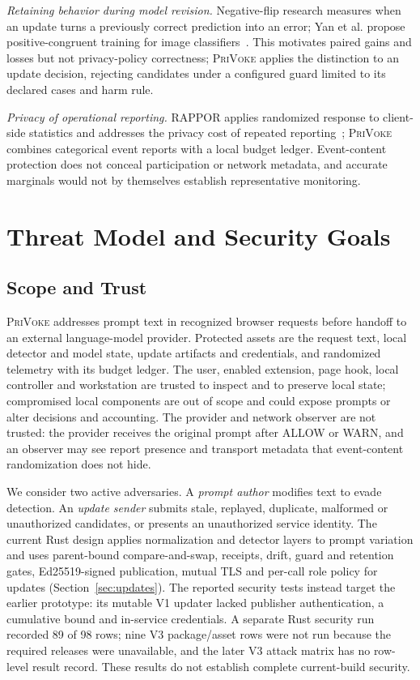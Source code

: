 \documentclass[sigconf]{acmart}
\theoremstyle{acmdefinition}\newtheorem{property}{Property}
\newcommand{\privoke}{\textsc{PriVoke}\xspace}
\begin{document}
\textit{Retaining behavior during model revision.} Negative-flip research measures when an update turns a previously correct prediction into an error; Yan et al. propose positive-congruent training for image classifiers~\cite{YanPositiveCongruent2021}. This motivates paired gains and losses but not privacy-policy correctness; \privoke applies the distinction to an update decision, rejecting candidates under a configured guard limited to its declared cases and harm rule.

\textit{Privacy of operational reporting.} RAPPOR applies randomized response to client-side statistics and addresses the privacy cost of repeated reporting~\cite{ErlingssonRappor2014}; \privoke combines categorical event reports with a local budget ledger. Event-content protection does not conceal participation or network metadata, and accurate marginals would not by themselves establish representative monitoring.

\section{Threat Model and Security Goals}
\subsection{Scope and Trust}
\label{sec:threat_model}
\privoke addresses prompt text in recognized browser requests before handoff to an external language-model provider. Protected assets are the request text, local detector and model state, update artifacts and credentials, and randomized telemetry with its budget ledger. The user, enabled extension, page hook, local controller and workstation are trusted to inspect and to preserve local state; compromised local components are out of scope and could expose prompts or alter decisions and accounting. The provider and network observer are not trusted: the provider receives the original prompt after ALLOW or WARN, and an observer may see report presence and transport metadata that event-content randomization does not hide.

We consider two active adversaries. A \emph{prompt author} modifies text to evade detection. An \emph{update sender} submits stale, replayed, duplicate, malformed or unauthorized candidates, or presents an unauthorized service identity. The current Rust design applies normalization and detector layers to prompt variation and uses parent-bound compare-and-swap, receipts, drift, guard and retention gates, Ed25519-signed publication, mutual TLS and per-call role policy for updates (Section~\ref{sec:updates}). The reported security tests instead target the earlier prototype: its mutable V1 updater lacked publisher authentication, a cumulative bound and in-service credentials. A separate Rust security run recorded 89 of 98 rows; nine V3 package/asset rows were not run because the required releases were unavailable, and the later V3 attack matrix has no row-level result record. These results do not establish complete current-build security.
\end{document}
